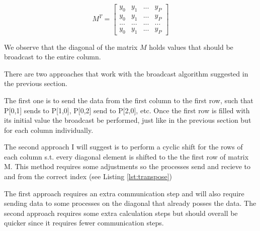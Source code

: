 \documentclass[a4paper]{exam}
\begin{document}
\begin{questions}
\begin{solution}
\begin{equation*} M^T =
  \begin{bmatrix}
    y_0 & y_1 & ... &y_P\\
    y_0 & y_1 & ... &y_P\\
    ... & ... & ... &...\\
    y_0 & y_1 & ... &y_P
  \end{bmatrix}
\end{equation*}

We observe that the diagonal of the matrix $M$ holds values that should be broadcast to the entire column.

There are two approaches that work with the broadcast algorithm suggested in the previous section.

The first one is to send the data from the first column to the first row, such that P[0,1] sends to P[1,0], P[0,2] send to P[2,0], etc. Once the first row is filled with its initial value the broadcast be performed, just like in the previous section but for each column individually.

The second approach I will suggest is to perform a cyclic shift for the rows of each column s.t. every diagonal element is shifted to the the first row of matrix M. This method requires some adjustments so the processes send and recieve to and from the correct index (see Listing \ref{lst:transpose})

The first approach requires an extra communication step and will also require sending data to some processes on the diagonal that already posses the data. The second approach requires some extra calculation steps but should overall be quicker since it requires fewer communication steps.
\end{solution}





\end{questions}
\end{document}
